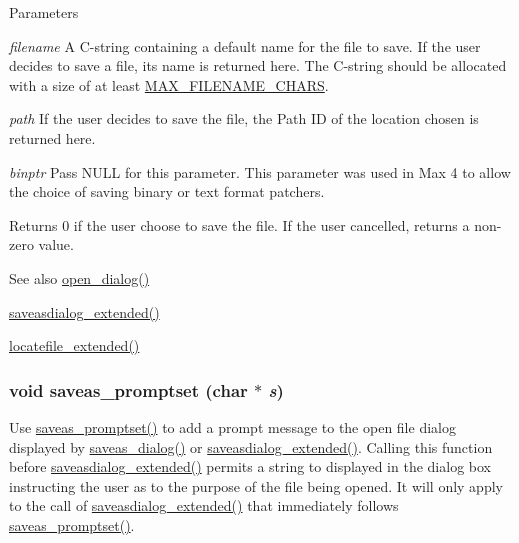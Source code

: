 \begin{DoxyParams}{Parameters}
\item[{\em filename}]A C-\/string containing a default name for the file to save. If the user decides to save a file, its name is returned here. The C-\/string should be allocated with a size of at least \hyperlink{group__files_ga481556de2ccf516a499525edebc45ee8}{MAX\_\-FILENAME\_\-CHARS}.\item[{\em path}]If the user decides to save the file, the Path ID of the location chosen is returned here.\item[{\em binptr}]Pass NULL for this parameter. This parameter was used in Max 4 to allow the choice of saving binary or text format patchers.\end{DoxyParams}
\begin{DoxyReturn}{Returns}
0 if the user choose to save the file. If the user cancelled, returns a non-\/zero value.
\end{DoxyReturn}
\begin{DoxySeeAlso}{See also}
\hyperlink{group__files_ga0d8fd0b13e2e623298a45e846af3fe1a}{open\_\-dialog()} 

\hyperlink{group__files_gad43815aaa436e518a5cc68d2a340e4de}{saveasdialog\_\-extended()} 

\hyperlink{group__files_gaa2899b66e1457da0ee333f9407230ccd}{locatefile\_\-extended()} 
\end{DoxySeeAlso}
\hypertarget{group__files_ga16a1f7bdea74c0e0009210a8430d0654}{
\subsubsection[{saveas\_\-promptset}]{\setlength{\rightskip}{0pt plus 5cm}void saveas\_\-promptset (char $\ast$ {\em s})}}
\label{group__files_ga16a1f7bdea74c0e0009210a8430d0654}


Use \hyperlink{group__files_ga16a1f7bdea74c0e0009210a8430d0654}{saveas\_\-promptset()} to add a prompt message to the open file dialog displayed by \hyperlink{group__files_gaf526009ce84aed6f6213c4a99f6bd72d}{saveas\_\-dialog()} or \hyperlink{group__files_gad43815aaa436e518a5cc68d2a340e4de}{saveasdialog\_\-extended()}. Calling this function before \hyperlink{group__files_gad43815aaa436e518a5cc68d2a340e4de}{saveasdialog\_\-extended()} permits a string to displayed in the dialog box instructing the user as to the purpose of the file being opened. It will only apply to the call of \hyperlink{group__files_gad43815aaa436e518a5cc68d2a340e4de}{saveasdialog\_\-extended()} that immediately follows \hyperlink{group__files_ga16a1f7bdea74c0e0009210a8430d0654}{saveas\_\-promptset()}.


